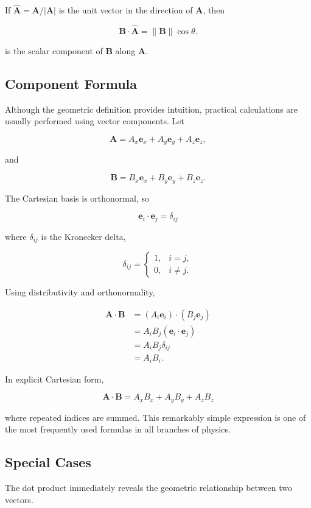 If $\widehat{\mathbf A}=\mathbf A/\lvert\mathbf A\rvert$ is the unit vector in
the direction of $\mathbf A$, then

\[
\mathbf B\cdot\widehat{\mathbf A}
=
\lVert\mathbf B\rVert\cos\theta.
\]

is the scalar component of $\mathbf B$ along $\mathbf A$.

\subsection{Component Formula}

Although the geometric definition provides intuition, practical calculations
are usually performed using vector components. Let

\[
\mathbf A
=A_x\mathbf e_x+A_y\mathbf e_y+A_z\mathbf e_z,
\]

and

\[
\mathbf B
=B_x\mathbf e_x+B_y\mathbf e_y+B_z\mathbf e_z.
\]

The Cartesian basis is orthonormal, so

\[
\boxed{
\mathbf e_i\cdot\mathbf e_j=\delta_{ij}
}
\]

where $\delta_{ij}$ is the Kronecker delta,

\[
\delta_{ij}
=
\begin{cases}
1, & i=j,\\
0, & i\neq j.
\end{cases}
\]

Using distributivity and orthonormality,

\begin{align*}
\mathbf A\cdot\mathbf B
&=
(A_i\mathbf e_i)\cdot(B_j\mathbf e_j)\\
&=
A_iB_j(\mathbf e_i\cdot\mathbf e_j)\\
&=
A_iB_j\delta_{ij}\\
&=
A_iB_i.
\end{align*}

In explicit Cartesian form,

\[
\boxed{
\mathbf A\cdot\mathbf B
=
A_xB_x+A_yB_y+A_zB_z
}
\]

where repeated indices are summed. This remarkably simple expression is one of
the most frequently used formulas in all branches of physics.

\subsection{Special Cases}

The dot product immediately reveals the geometric relationship between two
vectors.

